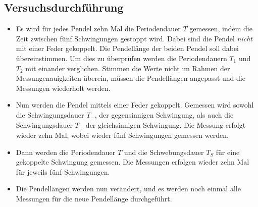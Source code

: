 \subsection{Versuchsdurchführung}
\begin{itemize}
    \item Es wird für jedes Pendel zehn Mal die Periodendauer $T$ gemessen, indem die Zeit zwischen fünf Schwingungen gestoppt wird. Dabei sind die Pendel
        \textit{nicht} mit einer Feder gekoppelt. Die Pendellänge der beiden Pendel soll dabei übereinstimmen. Um dies zu überprüfen werden die Periodendauern
        $T_1$ und $T_2$ mit einander verglichen. Stimmen die Werte nicht im Rahmen der Messungenauigkeiten überein, müssen die Pendellängen angepasst und die
        Messungen wiederholt werden.
    \item Nun werden die Pendel mittels einer Feder gekoppelt. Gemessen wird sowohl die Schwingungsdauer $T_-$, der gegensinnigen Schwingung, als auch die
        Schwingungsdauer $T_+$ der gleichsinnigen Schwingung. Die Messung erfolgt wieder zehn Mal, wobei wieder fünf Schwingungen gemessen werden.
    \item Dann werden die Periodendauer $T$ und die Schwebungsdauer $T_S$ für eine gekoppelte Schwingung gemessen. Die Messungen erfolgen wieder zehn Mal für
        jeweils fünf Schwingungen.
    \item Die Pendellängen werden nun verändert, und es werden noch einmal alle Messungen für die neue Pendellänge durchgeführt.
\end{itemize}
